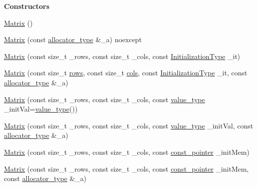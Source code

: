 \begin{Indent}\textbf{ Constructors}\par
\begin{DoxyCompactItemize}
\item 
\hyperlink{classanpi_1_1Matrix_a4b039deade03b4163486c8bc02309f14}{Matrix} ()
\item 
\hyperlink{classanpi_1_1Matrix_a348dd0fe5804e67d54152f10100fda47}{Matrix} (const \hyperlink{classanpi_1_1Matrix_a3574b7528e3ddfb2f7cdf446be8286c1}{allocator\+\_\+type} \&\+\_\+a) noexcept
\item 
\hyperlink{classanpi_1_1Matrix_abf385754354f6558e6b9e4df8103efc2}{Matrix} (const size\+\_\+t \+\_\+rows, const size\+\_\+t \+\_\+cols, const \hyperlink{namespaceanpi_a57664960c64a6275e3bf1c70d6fab177}{Initialization\+Type} \+\_\+it)
\item 
\hyperlink{classanpi_1_1Matrix_ac5498f0ddd9149751d99ce04d2a33e38}{Matrix} (const size\+\_\+t \hyperlink{classanpi_1_1Matrix_a44ad72297afd1e3cf0b4586f004243f5}{rows}, const size\+\_\+t \hyperlink{classanpi_1_1Matrix_a42d956c83ca2f25dba6397b597410c54}{cols}, const \hyperlink{namespaceanpi_a57664960c64a6275e3bf1c70d6fab177}{Initialization\+Type} \+\_\+it, const \hyperlink{classanpi_1_1Matrix_a3574b7528e3ddfb2f7cdf446be8286c1}{allocator\+\_\+type} \&\+\_\+a)
\item 
\hyperlink{classanpi_1_1Matrix_a64edbb05eacef213f35a6fc73452c66c}{Matrix} (const size\+\_\+t \+\_\+rows, const size\+\_\+t \+\_\+cols, const \hyperlink{classanpi_1_1Matrix_ad755076524c16fc494a392b0a66065cb}{value\+\_\+type} \+\_\+init\+Val=\hyperlink{classanpi_1_1Matrix_ad755076524c16fc494a392b0a66065cb}{value\+\_\+type}())
\item 
\hyperlink{classanpi_1_1Matrix_ad82b357ca27b1ed1046fec80dd9f6495}{Matrix} (const size\+\_\+t \+\_\+rows, const size\+\_\+t \+\_\+cols, const \hyperlink{classanpi_1_1Matrix_ad755076524c16fc494a392b0a66065cb}{value\+\_\+type} \+\_\+init\+Val, const \hyperlink{classanpi_1_1Matrix_a3574b7528e3ddfb2f7cdf446be8286c1}{allocator\+\_\+type} \&\+\_\+a)
\item 
\hyperlink{classanpi_1_1Matrix_a5a61678fa5bcf2b7a81bd5400b9dfe8a}{Matrix} (const size\+\_\+t \+\_\+rows, const size\+\_\+t \+\_\+cols, const \hyperlink{classanpi_1_1Matrix_ac6d45526407ea4455424debdc4f21b91}{const\+\_\+pointer} \+\_\+init\+Mem)
\item 
\hyperlink{classanpi_1_1Matrix_acf7b5988a7b8ccab1ae40214ab7d5ab5}{Matrix} (const size\+\_\+t \+\_\+rows, const size\+\_\+t \+\_\+cols, const \hyperlink{classanpi_1_1Matrix_ac6d45526407ea4455424debdc4f21b91}{const\+\_\+pointer} \+\_\+init\+Mem, const \hyperlink{classanpi_1_1Matrix_a3574b7528e3ddfb2f7cdf446be8286c1}{allocator\+\_\+type} \&\+\_\+a)

\end{DoxyCompactItemize}
\end{Indent}

